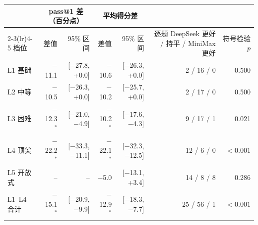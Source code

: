 \begin{tabular}{lrrrrrr}
\toprule
 & \multicolumn{2}{c}{pass@1 差（百分点）} & \multicolumn{2}{c}{平均得分差} & & \\
\cmidrule(lr){2-3}\cmidrule(lr){4-5}
档位 & 差值 & 95\% 区间 & 差值 & 95\% 区间 & 逐题 DeepSeek 更好 / 持平 / MiniMax 更好 & 符号检验 $p$ \\
\midrule
L1 基础 & $-$11.1 & [$-$27.8, +0.0] & $-$10.6 & [$-$26.3, +0.0] & 2 / 16 / 0 & 0.500 \\
L2 中等 & $-$10.5 & [$-$26.3, +0.0] & $-$10.2 & [$-$25.7, +0.0] & 2 / 17 / 0 & 0.500 \\
L3 困难 & $-$12.3$^{*}$ & [$-$21.0, $-$4.9] & $-$10.2$^{*}$ & [$-$17.6, $-$4.3] & 9 / 17 / 1 & 0.021 \\
L4 顶尖 & $-$22.2$^{*}$ & [$-$33.3, $-$11.1] & $-$22.1$^{*}$ & [$-$32.3, $-$12.5] & 12 / 6 / 0 & $<0.001$ \\
L5 开放式 & -- & -- & $-$5.0 & [$-$13.1, +3.4] & 14 / 8 / 8 & 0.286 \\
\midrule
L1--L4 合计 & $-$15.1$^{*}$ & [$-$20.9, $-$9.9] & $-$12.9$^{*}$ & [$-$18.3, $-$7.7] & 25 / 56 / 1 & $<0.001$ \\
\bottomrule
\end{tabular}
